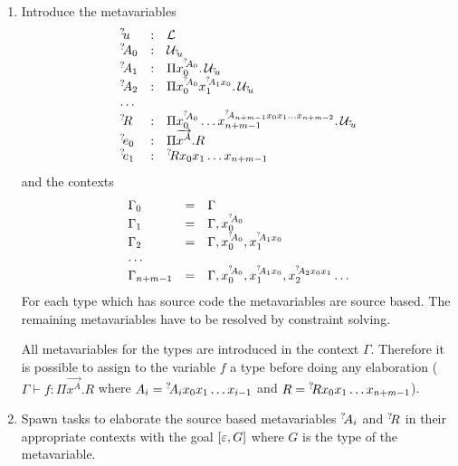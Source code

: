\begin{enumerate}

    \item
        Introduce the metavariables
        $$
        \vertlist{
            \meta u &:& \Univ
            \\
            \meta A_0 &:& \Any_{\meta u}
            \\
            \meta A_1 &:& \Pi x_0^{\meta A_0}. \, \Any_{\meta u}
            \\
            \meta A_2 &:& \Pi x_0^{\meta A_0} x_1^{\meta A_1 x_0}. \,
            \Any_{\meta u}
            \\
            \ldots
            \\
            \meta R
            &:&
            \Pi
                x_0^{\meta A_0}
                \ldots
                x_{n+m-1}^{\meta A_{n+m-1} x_0 x_1 \ldots x_{n+m-2}}
            . \, \Any_{\meta u}
            \\
            \meta e_0
            &:&
            \Pi \vec {x^A}. R
            \\
            \meta e_1
            &:&
            \meta R x_0 x_1 \ldots x_{n+m-1}
        }
        $$
        and the contexts
        $$
        \begin{array}{lllll} 
            \Gamma_0 &=& \Gamma
            \\
            \Gamma_1 &=&
                \Gamma, x_0^{{{}^? \kern-0.2em A}_0}
            \\
            \Gamma_2 &=&
                \Gamma, x_0^{{{}^? \kern-0.2em A}_0}, x_1^{{{}^? \kern-0.2em A}_1 x_0}
            \\
            \ldots
            \\
            \Gamma_{n+m-1} &=&
                \Gamma,
                    x_0^{{{}^? \kern-0.2em A}_0},
                    x_1^{{{}^? \kern-0.2em A}_1 x_0},
                    x_2^{{{}^? \kern-0.2em A}_2 x_0 x_1}
                    \ldots
         \end{array}
        $$
        For each type which has source code the metavariables are source based.
        The remaining metavariables have to be resolved by constraint solving.

        All metavariables for the types are introduced in the context $\Gamma$.
        Therefore it is possible to assign to the variable $f$ a type before
        doing any elaboration (
        $\Gamma \vdash f : \Pi \vec {x^A}. R$
        where
        $A_i = {{}^? \kern-0.2em A}_i x_0 x_1 \ldots x_{i-1}$
        and
        $R = {{}^? \kern-0.2em R} x_0 x_1 \ldots x_{n+m-1}$).

    \item Spawn tasks to elaborate the source based metavariables ${{}^? \kern-0.2em A}_i$
        and ${{}^? \kern-0.2em R}$ in their
        appropriate contexts with the goal $[\varepsilon, G]$ where $G$ is the type
        of the metavariable.


\end{enumerate}
